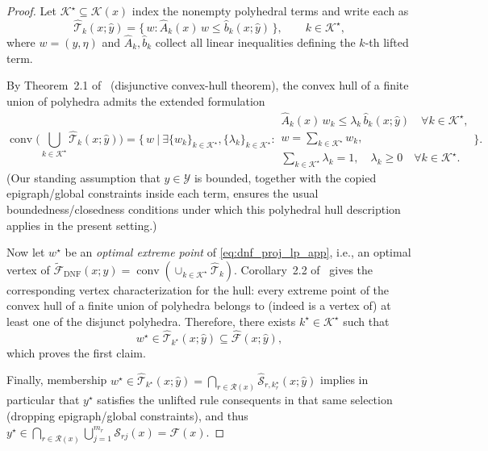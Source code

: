 \documentclass{article}
\theoremstyle{plain}
\theoremstyle{definition}
\theoremstyle{remark}
\begin{document}
\begin{proof}
Let $\mathcal{K}^\star\subseteq\mathcal{K}(x)$ index the nonempty polyhedral terms and write each as
\[
\widehat{\mathcal{T}}_{k}(x;\hat y)
=
\{\, w : \widehat A_k(x)\, w \le \widehat b_k(x;\hat y)\,\},
\qquad k\in\mathcal{K}^\star,
\]
where $w=(y,\eta)$ and $\widehat A_k,\widehat b_k$ collect all linear inequalities defining the $k$-th lifted term.

By Theorem~2.1 of~\cite{balas2018disjunctive} (disjunctive convex-hull theorem), the convex hull of a finite union of polyhedra admits the extended formulation
\begin{equation}\label{eq:balas_hull_app}
\operatorname{conv}\!\Big(\bigcup_{k\in\mathcal{K}^\star} \widehat{\mathcal{T}}_{k}(x;\hat y)\Big)
=
\Bigg\{\, w\ \Bigg|\ 
\exists \{w_k\}_{k\in\mathcal{K}^\star},\{\lambda_k\}_{k\in\mathcal{K}^\star}:
\begin{array}{l}
\widehat A_k(x)\, w_k \le \lambda_k\, \widehat b_k(x;\hat y)\quad \forall k\in\mathcal{K}^\star,\\[2pt]
w=\sum_{k\in\mathcal{K}^\star} w_k,\\[2pt]
\sum_{k\in\mathcal{K}^\star} \lambda_k = 1,\quad \lambda_k\ge 0\quad \forall k\in\mathcal{K}^\star.
\end{array}
\Bigg\}.
\end{equation}
(Our standing assumption that $y\in\mathcal{Y}$ is bounded, together with the copied epigraph/global constraints inside each term,
ensures the usual boundedness/closedness conditions under which this polyhedral hull description applies in the present setting.)

Now let $w^\star$ be an \emph{optimal extreme point} of \eqref{eq:dnf_proj_lp_app}, i.e., an optimal vertex of
$\widetilde{\mathcal{F}}_{\mathrm{DNF}}(x;\hat y)=\operatorname{conv}(\cup_{k\in\mathcal{K}^\star}\widehat{\mathcal{T}}_{k})$.
Corollary~2.2 of~\cite{balas2018disjunctive} gives the corresponding vertex characterization for the hull:
every extreme point of the convex hull of a finite union of polyhedra belongs to (indeed is a vertex of) at least one of the disjunct polyhedra.
Therefore, there exists $k^\star\in\mathcal{K}^\star$ such that
\[
w^\star \in \widehat{\mathcal{T}}_{k^\star}(x;\hat y)\subseteq \widehat{\mathcal{F}}(x;\hat y),
\]
which proves the first claim.

Finally, membership $w^\star\in \widehat{\mathcal{T}}_{k^\star}(x;\hat y)=\bigcap_{r\in\mathcal{R}(x)}\widehat{\mathcal{S}}_{r,k_r^\star}(x;\hat y)$
implies in particular that $y^\star$ satisfies the unlifted rule consequents in that same selection (dropping epigraph/global constraints),
and thus $y^\star\in \bigcap_{r\in\mathcal{R}(x)} \bigcup_{j=1}^{m_r} \mathcal{S}_{rj}(x)=\mathcal{F}(x)$.
\end{proof}
\end{document}
